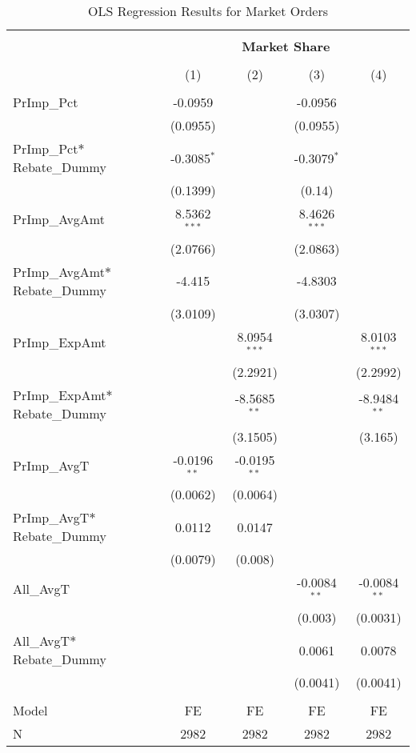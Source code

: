 \documentclass[11pt,a4paper]{article}
\begin{document}
\begin{table}[!htbp] 
	\captionsetup{font=normal}
	\caption{OLS Regression Results for Market Orders} 
	\label{} 
	\centering
	\small
	\begin{tabular}{@{\extracolsep{1em}}lcccc} 
		\\[-1.8ex]
		\toprule \\[-1.8ex] 
		& \multicolumn{4}{c}{\textbf{Market Share}} \\ 
		\cline{2-5} 
		\\[-1.8ex] & (1) & (2) & (3) & (4)\\ 
		\hline \\[-1.8ex] 
		PrImp\_Pct & -0.0959 &  & -0.0956 & \\
		& (0.0955) &  & (0.0955) & \\ [1.5ex]
		PrImp\_Pct$*$Rebate\_Dummy & -0.3085$^{*}$ &  & -0.3079$^{*}$ & \\
		& (0.1399) &  & (0.14) & \\ [1.5ex]
		PrImp\_AvgAmt & 8.5362$^{***}$ &  & 8.4626$^{***}$ & \\
		& (2.0766) &  & (2.0863) & \\ [1.5ex]
		PrImp\_AvgAmt$*$Rebate\_Dummy & -4.415 &  & -4.8303 & \\
		& (3.0109) &  & (3.0307) & \\ [1.5ex]
		PrImp\_ExpAmt &  & 8.0954$^{***}$ &  & 8.0103$^{***}$\\
		&  & (2.2921) &  & (2.2992)\\ [1.5ex]
		PrImp\_ExpAmt$*$Rebate\_Dummy &  & -8.5685$^{**}$ &  & -8.9484$^{**}$\\
		&  & (3.1505) &  & (3.165)\\ [1.5ex]
		PrImp\_AvgT & -0.0196$^{**}$ & -0.0195$^{**}$ &  & \\
		& (0.0062) & (0.0064) &  & \\ [1.5ex]
		PrImp\_AvgT$*$Rebate\_Dummy & 0.0112 & 0.0147 &  & \\
		& (0.0079) & (0.008) &  & \\ [1.5ex]
		All\_AvgT &  &  & -0.0084$^{**}$ & -0.0084$^{**}$\\
		&  &  & (0.003) & (0.0031)\\ [1.5ex]
		All\_AvgT$*$Rebate\_Dummy &  &  & 0.0061 & 0.0078\\
		&  &  & (0.0041) & (0.0041)\\ [1.5ex]
		\hline \\[-1.8ex] 
		Model & FE & FE & FE & FE \\ 
		N & 2982 & 2982 & 2982 & 2982 \\ 

\end{tabular}
\end{table}
\end{document}

